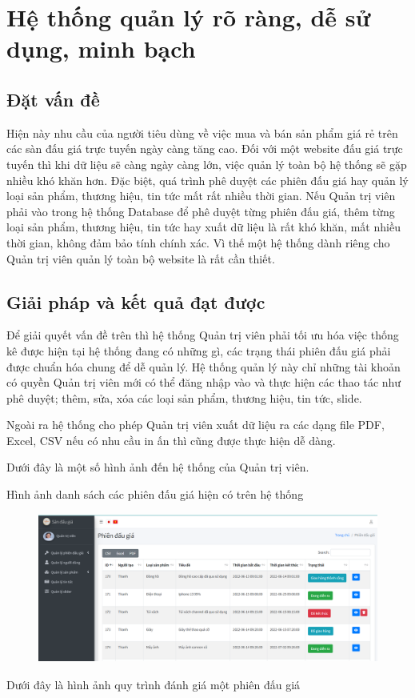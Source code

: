 \documentclass[../DoAn.tex]{subfiles}
\begin{document}
\section{Hệ thống quản lý rõ ràng, dễ sử dụng, minh bạch}
\subsection{Đặt vấn đề}
Hiện này nhu cầu của người tiêu dùng về việc mua và bán sản phẩm giá rẻ trên các sàn đấu giá trực tuyến ngày càng tăng cao. Đối với một website đấu giá trực tuyến thì khi dữ liệu sẽ càng ngày càng lớn, việc quản lý toàn bộ hệ thống sẽ gặp nhiều khó khăn hơn. Đặc biệt, quá trình phê duyệt các phiên đấu giá hay quản lý loại sản phẩm, thương hiệu, tin tức mất rất nhiều thời gian. Nếu Quản trị viên phải vào trong hệ thống Database để phê duyệt từng phiên đấu giá, thêm từng loại sản phẩm, thương hiệu, tin tức hay xuất dữ liệu là rất khó khăn, mất nhiều thời gian, không đảm bảo tính chính xác. Vì thế một hệ thống dành riêng cho Quản trị viên quản lý toàn bộ website là rất cần thiết. 
\subsection{Giải pháp và kết quả đạt được}
Để giải quyết vấn đề trên thì hệ thống Quản trị viên phải tối ưu hóa việc thống kê được hiện tại hệ thống đang có những gì, các trạng thái phiên đấu giá phải được chuẩn hóa chung để dễ quản lý. Hệ thống quản lý này chỉ những tài khoản có quyền Quản trị viên mới có thể đăng nhập vào và thực hiện các thao tác như phê duyệt; thêm, sửa, xóa các loại sản phẩm, thương hiệu, tin tức, slide.

Ngoài ra hệ thống cho phép Quản trị viên xuất dữ liệu ra các dạng file PDF, Excel, CSV nếu có nhu cầu in ấn thì cũng được thực hiện dễ dàng. 

Dưới đây là một số hình ảnh đến hệ thống của Quản trị viên.

Hình ảnh danh sách các phiên đấu giá hiện có trên hệ thống
\begin{figure}[H]
    \centering
    \includegraphics[width=0.75\linewidth,height=4.91cm]{Hinhve/adminmanager.png}
\end{figure}
Dưới đây là hình ảnh quy trình đánh giá một phiên đấu giá
\end{document}
